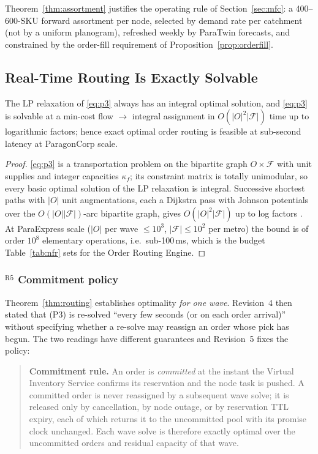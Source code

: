 Theorem~\ref{thm:assortment} justifies the operating rule of Section~\ref{sec:mfc}: a 400--600-SKU forward assortment per node, selected by demand rate per catchment (not by a uniform planogram), refreshed weekly by ParaTwin forecasts, and constrained by the order-fill requirement of Proposition~\ref{prop:orderfill}.

\subsection{Real-Time Routing Is Exactly Solvable}

\begin{theorem}\label{thm:routing}
The LP relaxation of \eqref{eq:p3} always has an integral optimal solution, and \eqref{eq:p3} is solvable at a min-cost flow $\to$ integral assignment in $O(|O|^2|\mathcal{F}|)$ time up to logarithmic factors; hence exact optimal order routing is feasible at sub-second latency at ParagonCorp scale.
\end{theorem}
\begin{proof}
\eqref{eq:p3} is a transportation problem on the bipartite graph $O\times\mathcal{F}$ with unit supplies and integer capacities $\kappa_f$; its constraint matrix is totally unimodular, so every basic optimal solution of the LP relaxation is integral. Successive shortest paths with $|O|$ unit augmentations, each a Dijkstra pass with Johnson potentials over the $O(|O||\mathcal{F}|)$-arc bipartite graph, gives $O(|O|^2|\mathcal{F}|)$ up to log factors \cite{ahuja1993}. At ParaExpress scale ($|O|$ per wave $\le10^3$, $|\mathcal{F}|\le10^2$ per metro) the bound is of order $10^8$ elementary operations, i.e.\ sub-100\,ms, which is the budget Table~\ref{tab:nfr} sets for the Order Routing Engine.
\end{proof}

\subsubsection*{$^{\mathrm{R5}}$ Commitment policy}\label{sec:commit}

Theorem~\ref{thm:routing} establishes optimality \emph{for one wave}. Revision~4 then stated that (P3) is re-solved ``every few seconds (or on each order arrival)'' without specifying whether a re-solve may reassign an order whose pick has begun. The two readings have different guarantees and Revision~5 fixes the policy:

\begin{quote}
\textbf{Commitment rule.} An order is \emph{committed} at the instant the Virtual Inventory Service confirms its reservation and the node task is pushed. A committed order is never reassigned by a subsequent wave solve; it is released only by cancellation, by node outage, or by reservation TTL expiry, each of which returns it to the uncommitted pool with its promise clock unchanged. Each wave solve is therefore exactly optimal over the uncommitted orders and residual capacity of that wave.
\end{quote}

